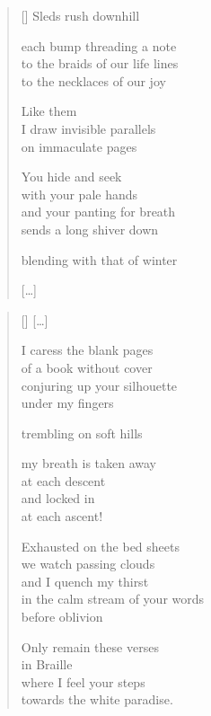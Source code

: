\documentclass[14pt]{extbook}
\newcommand*{\centeredornament}{\centerline{\pgfornament[width=6cm]{88}}}
\begin{document}
\newpage

\vspace*{-15mm}
\centeredornament
\vspace*{-7mm}


\settowidth{\versewidth}{to the necklaces of their laughter}

\begin{verse}[\versewidth]
  Sleds rush downhill

  each bump threading a note \\
  to the braids of our life lines \\
  to the necklaces of our joy

  Like them \\
  I draw invisible parallels \\
  on immaculate pages

  You hide and seek \\
  with your pale hands \\
  and your panting for breath \\
  sends a long shiver down

  blending with that of winter

  \hfill [\ldots]
\end{verse}

\newpage

\vspace*{-15mm}
\centeredornament
\vspace*{-7mm}

\poemtitle*{\phantom{XX}}

\settowidth{\versewidth}{in the calm stream of your words}

\begin{verse}[\versewidth]
  \textnormal{[\ldots]}

  I caress the blank pages \\
  of a book without cover \\
  conjuring up your silhouette \\
  under my fingers

  trembling on soft hills

  my breath is taken away \\
  at each descent \\
  and locked in \\
  at each ascent!

  Exhausted on the bed sheets \\
  we watch passing clouds \\
  and I quench my thirst \\
  in the calm stream of your words \\
  before oblivion

  Only remain these verses \\
  in Braille \\
  where I feel your steps \\
  towards the white paradise.
\end{verse}
\end{document}

